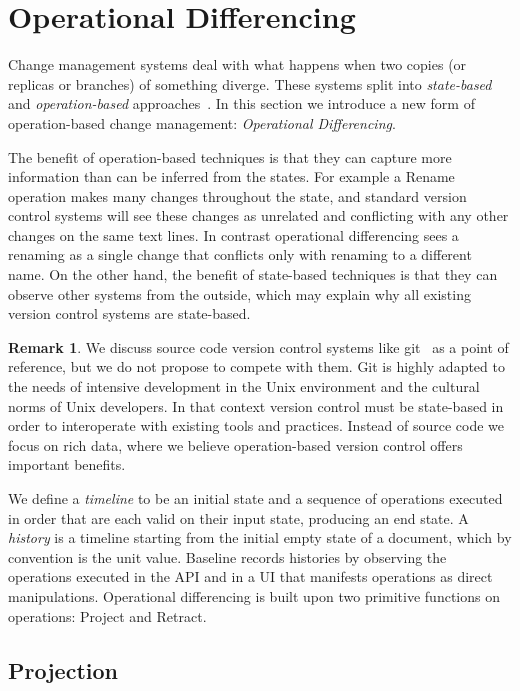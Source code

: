 \documentclass[english,submission]{programming}
\theoremstyle{definition}
\newtheorem*{remark}{Remark}
\begin{document}
\section{Operational Differencing}

Change management systems deal with what happens when two copies (or replicas or branches) of something diverge.
These systems split into \textit{state-based} and \textit{operation-based} approaches~\cite{diff3, Shapiro11}.
In this section we introduce a new form of operation-based change management: \textit{Operational Differencing}.

The benefit of operation-based techniques is that they can capture more information than can be inferred from the states.
For example a \textsf{Rename} operation makes many changes throughout the state, and standard version control systems will see these changes as unrelated and conflicting with any other changes on the same text lines. In contrast operational differencing sees a renaming as a single change that conflicts only with renaming to a different name.
On the other hand, the benefit of state-based techniques is that they can observe other systems from the outside, which may explain why all existing version control systems are state-based.

\begin{remark}
We discuss source code version control systems like git~\cite{ProGit} as a point of reference, but we do not propose to compete with them. Git is highly adapted to the needs of intensive development in the Unix environment and the cultural norms of Unix developers. In that context version control must be state-based in order to interoperate with existing tools and practices. Instead of source code we focus on rich data, where we believe operation-based version control offers important benefits.
\end{remark}

We define a \textit{timeline} to be an initial state and a sequence of operations executed in order that are each valid on their input state, producing an end state.
A \textit{history} is a timeline starting from the initial empty state of a document, which by convention is the unit value.
Baseline records histories by observing the operations executed in the API and in a UI that manifests operations as direct manipulations. Operational differencing is built upon two primitive functions on operations: \textsf{Project} and \textsf{Retract}.

\subsection{Projection}
\end{document}
